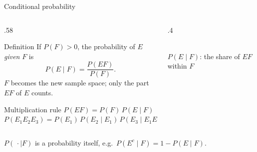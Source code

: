 \documentclass[aspectratio=169,11pt,usepdftitle=false]{beamer}
\newcommand{\Om}{\Omega}
\begin{document}
\begin{frame}{Conditional probability}
  \small
  \begin{columns}[T]
    \begin{column}{.58\textwidth}
      \begin{block}{Definition}
        If $P(F)>0$, the probability of $E$ \emph{given} $F$ is
        \[ P(E\mid F)=\frac{P(EF)}{P(F)}. \]
        $F$ becomes the new sample space; only the part $EF$ of $E$ counts.
      \end{block}
      \begin{block}{Multiplication rule}
        $P(EF)=P(F)\,P(E\mid F)$\\[2pt]
        $P(E_1E_2E_3)=P(E_1)\,P(E_2\mid E_1)\,P(E_3\mid E_1E_2)$
      \end{block}
    \end{column}
    \begin{column}{.4\textwidth}
      \centering
      \\[1mm]
      \footnotesize $P(E\mid F)$: the share of $EF$ within $F$
    \end{column}
  \end{columns}
  \vspace{1mm}
  $P(\,\cdot\mid F)$ is a probability itself, e.g.\
  $P(E^c\mid F)=1-P(E\mid F)$.
\end{frame}

\end{document}
